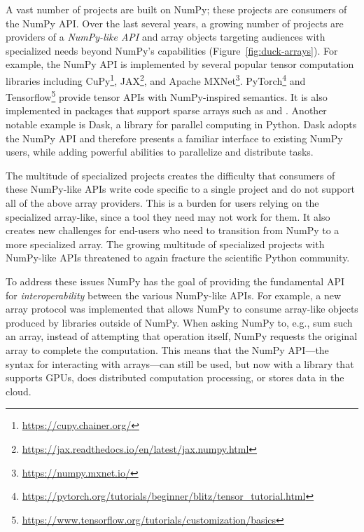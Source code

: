 A vast number of projects are built on NumPy;
these projects are consumers of the NumPy API.
Over the last several years, a growing number of projects are providers of
a \emph{NumPy-like API} and array objects targeting audiences with specialized
needs beyond NumPy's capabilities (Figure~\ref{fig:duck-arrays}).
For example, the NumPy API is implemented by several popular tensor computation
libraries including CuPy\footnote{\url{https://cupy.chainer.org/}},
JAX\footnote{\url{https://jax.readthedocs.io/en/latest/jax.numpy.html}},
and Apache MXNet\footnote{\url{https://numpy.mxnet.io/}}.
PyTorch\footnote{\url{https://pytorch.org/tutorials/beginner/blitz/tensor\_tutorial.html}}
and Tensorflow\footnote{\url{https://www.tensorflow.org/tutorials/customization/basics}}
provide tensor APIs with NumPy-inspired semantics.
It is also implemented in packages that support sparse arrays
such as  and .
Another notable example is Dask, a library for parallel computing in
Python.  Dask adopts the NumPy API and therefore presents a familiar
interface to existing NumPy users, while adding powerful abilities to
parallelize and distribute tasks.


The multitude of specialized projects creates the difficulty that consumers
of these NumPy-like APIs write code specific to a single project and do not support
all of the above array providers.
This is a burden for users relying on the specialized array-like, since
a tool they need may not work for them.
It also creates new challenges for end-users who need to transition
from NumPy to a more specialized array.
The growing multitude of specialized projects with NumPy-like APIs threatened
to again fracture the scientific Python community.


To address these issues NumPy has the goal of providing the fundamental
API for \emph{interoperability} between the various NumPy-like APIs.
For example, a new array protocol was implemented that allows NumPy to consume
array-like objects produced by libraries outside of NumPy.  When asking NumPy
to, e.g., sum such an array, instead of attempting that operation itself, NumPy
requests the original array to complete the computation.  This means that the
NumPy API---the syntax for interacting with arrays---can still be used, but now
with a library that supports GPUs, does distributed computation processing, or
stores data in the cloud.

